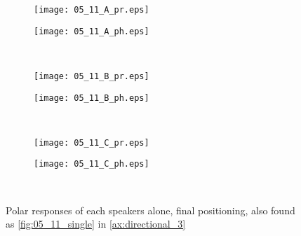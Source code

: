 \begin{figure}[H]
\begin{subfigure}[c]{0.5\textwidth}
\texttt{[image: 05\_11\_A\_pr.eps]}
\label{fig:05_11_A_pr}
\end{subfigure}
\begin{subfigure}[c]{0.5\textwidth}
\texttt{[image: 05\_11\_A\_ph.eps]}
\label{fig:05_11_A_ph}
\end{subfigure}\\
\hspace{0.1\textheight}
\begin{subfigure}[c]{0.5\textwidth}
\texttt{[image: 05\_11\_B\_pr.eps]}
\label{fig:05_11_B_pr}
\end{subfigure}
\begin{subfigure}[c]{0.5\textwidth}
\texttt{[image: 05\_11\_B\_ph.eps]}
\label{fig:05_11_B_ph}
\end{subfigure}\\
\hspace{0.1\textheight}
\begin{subfigure}[c]{0.5\textwidth}
\texttt{[image: 05\_11\_C\_pr.eps]}
\label{fig:05_11_C_pr}
\end{subfigure}
\begin{subfigure}[c]{0.5\textwidth}
\texttt{[image: 05\_11\_C\_ph.eps]}
\label{fig:05_11_C_ph}
\end{subfigure}\\
\caption{Polar responses of each speakers alone, final positioning, also found as \autoref{fig:05_11_single} in \autoref{ax:directional_3}}  
\label{fig:05_11_single_main}
\end{figure}

